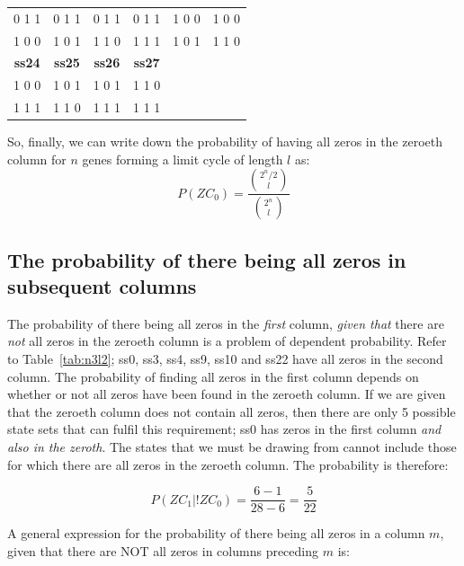 \documentclass[11pt, a4paper]{article}
\begin{document}
\begin{table}[h!]
\begin{center}
\begin{tabular}{c|c|c|c|c|c}
      \hline
      0 1 1       & 0 1 1       & 0 1 1       & 0 1 1       & 1 0 0      & 1 0 0       \\
      1 0 0       & 1 0 1       & 1 1 0       & 1 1 1       & 1 0 1      & 1 1 0       \\
      \hline
      \textbf{ss24} & \textbf{ss25} & \textbf{ss26} & \textbf{ss27} &        &             \\
      \hline
      1 0 0       & 1 0 1       & 1 0 1       & 1 1 0       &            &             \\
      1 1 1       & 1 1 0       & 1 1 1       & 1 1 1       &            &             \\
      \hline
    \end{tabular}
  \end{center}
\end{table}

So, finally, we can write down the probability of having all zeros in
the zeroeth column for $n$ genes forming a limit cycle of length $l$ as:
\begin{equation}
P(ZC_0) = \frac{\binom{2^n/2}{l}}{\binom{2^n}{l}}
\end{equation}

\subsection{The probability of there being all zeros in subsequent columns}

The probability of there being all zeros in the \emph{first}
column, \emph{given that} there are \emph{not} all zeros in the
zeroeth column is a problem of dependent probability. Refer to
Table~\ref{tab:n3l2}; ss0, ss3, ss4, ss9, ss10 and ss22 have all zeros
in the second column. The probability of finding all zeros in the
first column depends on whether or not all zeros have been found in
the zeroeth column. If we are given that the zeroeth column does not
contain all zeros, then there are only 5 possible state sets that can
fulfil this requirement; ss0 has zeros in the first column \emph{and
also in the zeroth}. The states that we must be drawing from cannot
include those for which there are all zeros in the zeroeth column. The
probability is therefore:

\begin{equation}
P(ZC_1|!ZC_0) = \frac{6 -1}{28-6} = \frac{5}{22}
\end{equation}

A general expression for the probability of there being all zeros in a
column $m$, given that there are NOT all zeros in columns preceding
$m$ is:
\end{document}
